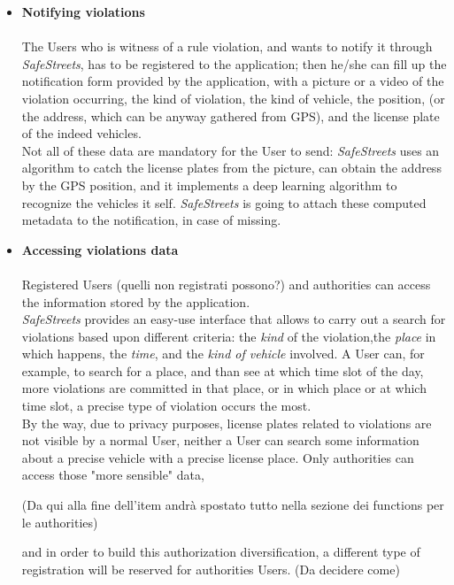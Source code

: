 \begin{itemize}
    \item \textbf{Notifying violations}\\\\
    The Users who is witness of a rule violation, and wants to notify it through \textit{SafeStreets}, has to be registered to the application; then he/she can fill up the notification form provided by the application, with a picture or a video of the violation occurring, the kind of violation, the kind of vehicle, the position, (or the address, which can be anyway gathered from GPS), and the license plate of the indeed vehicles.\\
    Not all of these data are mandatory for the User to send: \textit{SafeStreets} uses an algorithm to catch the license plates from the picture, can obtain the address by the GPS position, and it implements a deep learning algorithm to recognize the vehicles it self. \textit{SafeStreets} is going to attach these computed metadata to the notification, in case of missing.
    
    \item\textbf{Accessing violations data}\\\\
    Registered Users (quelli non registrati possono?) and authorities can access the information stored by the application. \\ \textit{SafeStreets} provides an easy-use interface that allows to  carry out a search for violations based upon different criteria: the \textit{kind} of the violation,the \textit{place} in which happens, the \textit{time}, and the \textit{kind of vehicle} involved. A User can, for example, to search for a place, and than see at which time slot of the day, more violations are committed in that place, or in which place or at which time slot, a precise type of violation occurs the most.\\
    By the way, due to privacy purposes, license plates related to violations are not visible by a normal User, neither a User can search some information about a precise vehicle with a precise license place. Only authorities can access those "more sensible" data,  
    
    (Da qui alla fine dell'item andrà spostato tutto nella sezione dei functions per le authorities) 
    
    and in order to build this authorization diversification, a different type of registration will be reserved for authorities Users. (Da decidere come)
    

\end{itemize}
